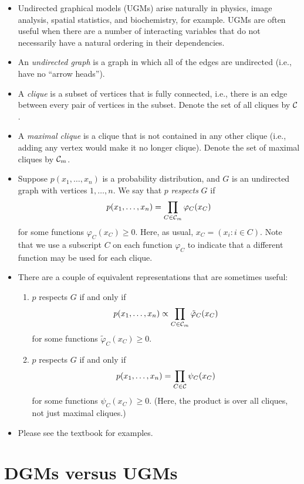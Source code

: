 \documentclass[12pt]{article}
\begin{document}
\begin{itemize}
\item Undirected graphical models (UGMs) arise naturally in physics, image analysis, spatial statistics, and biochemistry, for example. UGMs are often useful when there are a number of interacting variables that do not necessarily have a natural ordering in their dependencies.
\item An \textit{undirected graph} is a graph in which all of the edges are undirected (i.e., have no ``arrow heads'').
\item A \textit{clique} is a subset of vertices that is fully connected, i.e., there is an edge between every pair of vertices in the subset. Denote the set of all cliques by $\mathcal{C}$.
\item A \textit{maximal clique} is a clique that is not contained in any other clique (i.e., adding any vertex would make it no longer clique). Denote the set of maximal cliques by $\mathcal{C}_m$.
\item Suppose $p(x_1,\ldots,x_n)$ is a probability distribution, and $G$ is an undirected graph with vertices $1,\ldots,n$. We say that $p$ \textit{respects} $G$ if
$$ p(x_1,\ldots,x_n) = \prod_{C \in \mathcal{C}_m} \varphi_C(x_C) $$
for some functions $\varphi_C(x_C) \geq 0$. Here, as usual, $x_C = (x_i:i \in C)$. Note that we use a subscript $C$ on each function $\varphi_C$ to indicate that a different function may be used for each clique.
\item There are a couple of equivalent representations that are sometimes useful:
\begin{enumerate}
\item $p$ respects $G$ if and only if
$$ p(x_1,\ldots,x_n) \propto \prod_{C \in \mathcal{C}_m} \tilde\varphi_C(x_C) $$
for some functions $\tilde\varphi_C(x_C) \geq 0$.
\item $p$ respects $G$ if and only if
$$ p(x_1,\ldots,x_n) = \prod_{C \in \mathcal{C}} \psi_C(x_C) $$
for some functions $\psi_C(x_C) \geq 0$. (Here, the product is over all cliques, not just maximal cliques.)
\end{enumerate}
\item Please see the textbook for examples.
\end{itemize}


\section{DGMs versus UGMs}
\end{document}

